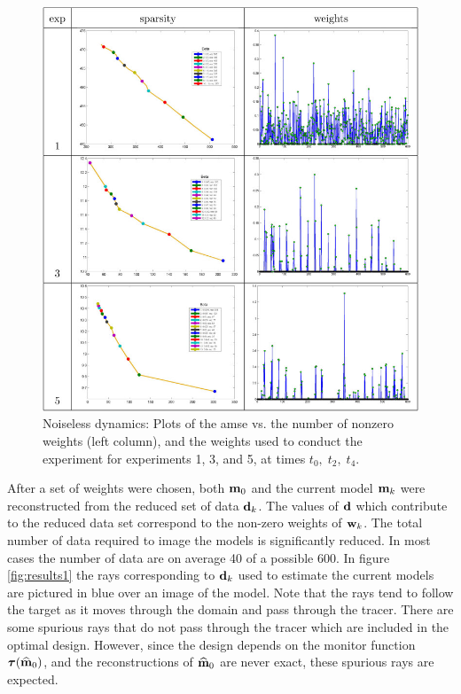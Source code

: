 \documentclass[11pt]{article}
\begin{document}
\begin{figure}
	\renewcommand{\arraystretch}{1.5}
	\begin{center}
		\iwidth=130mm
					\includegraphics[width=1\iwidth]{figures/risk2}
	\end{center}
	\caption{Noiseless dynamics: Plots of the amse  vs. the number of nonzero weights (left column), and the weights used to conduct the experiment for experiments 1, 3, and 5, at times $t_0,\; t_2,\; t_4$.}
	\label{fig:weights1}
\end{figure}
After a set of weights were chosen, both ${\bf{m}}_0$ and the current model ${\bf{m}}_k$ were reconstructed from the reduced set of data ${\bf{d}}_k$. The values of ${\bf{d}}$ which contribute to the reduced data set correspond to the non-zero weights of ${\bf{w}}_k$. The total number of data required to image the models is significantly reduced. In most cases the number of data are on average  40 of a possible 600.
  In figure \ref{fig:results1} the rays corresponding to ${\bf{d}}_k$ used to estimate the current models are pictured in blue over an image of the model. Note that the rays tend to follow the target as it moves through the domain and pass through the tracer.
There are some spurious rays that do not pass through the tracer which are included in the optimal design. However, since the design depends on the monitor function  ${\boldsymbol \tau}({\widehat{{\bf{m}}}}_0)$, and the reconstructions of ${\widehat{{\bf{m}}}}_0$ are never exact,  these spurious rays are expected. 
\end{document}
